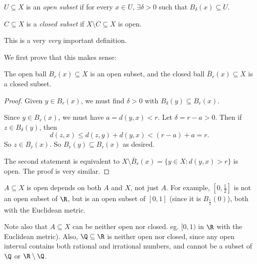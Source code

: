 \documentclass[a4paper]{article}
\begin{document}
\begin{defi}
  $U\subseteq X$ is an \emph{open subset} if for every $x\in U$, $\exists \delta > 0$ such that $B_\delta(x) \subseteq U$.

  $C\subseteq X$ is a \emph{closed subset} if $X\setminus C \subseteq X$ is open.
\end{defi}
This is a very \emph{very} important definition.

We first prove that this makes sense:

\begin{lemma}
  The open ball $B_r(x) \subseteq X$ is an open subset, and the closed ball $\bar{B}_r(x) \subseteq X$ is a closed subset.
\end{lemma}

\begin{proof}
  Given $y\in B_r(x)$, we must find $\delta > 0$ with $B_\delta(y) \subseteq B_r(x)$.
  \begin{center}
  \end{center}

  Since $y\in B_r(x)$, we must have $a = d(y, x) < r$. Let $\delta = r - a > 0$. Then if $z \in B_\delta (y)$, then
  \[
    d(z, x)\leq d(z, y) + d(y, x) < (r - a) + a = r.
  \]
  So $z \in B_r(x)$. So $B_r(y) \subseteq B_r(x)$ as desired.

  The second statement is equivalent to $X\setminus \bar{B}_r(x) = \{y\in X: d(y, x) > r\}$ is open. The proof is very similar.
\end{proof}
\note $A\subseteq X$ is open depends on both $A$ and $X$, not just $A$. For example, $[0, \frac{1}{2}]$ is not an open subset of $\R$, but is an open subset of $[0, 1]$ (since it is $B_{\frac{1}{2}}(0)$), both with the Euclidean metric.

Note also that $A\subseteq X$ can be neither open nor closed. eg. $[0, 1)$ in $\R$ with the Euclidean metric). Also, $\Q\subseteq \R$ is neither open nor closed, since any open interval contains both rational and irrational numbers, and cannot be a subset of $\Q$ or $\R \setminus \Q$.
\end{document}
